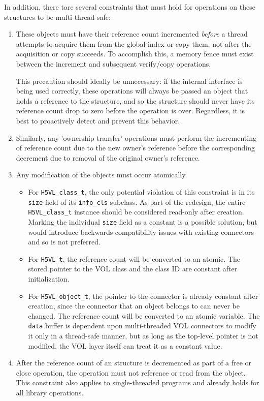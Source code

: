 \documentclass{article}
\begin{document}
In addition, there tare several constraints that must hold for operations on these structures to be multi-thread-safe:


\begin{enumerate}
    \item These objects must have their reference count incremented \textit{before} a thread attempts to acquire them from the global index or copy them, not after the acquisition or copy succeeds. To accomplish this, a memory fence must exist between the increment and subsequent verify/copy operations. 

    This precaution should ideally be unnecessary: if the internal interface is being used correctly, these operations will always be passed an object that holds a reference to the structure, and so the structure should never have its reference count drop to zero before the operation is over. Regardless, it is best to proactively detect and prevent this behavior.

    \item Similarly, any 'ownership transfer' operations must perform the incrementing of reference count due to the new owner's reference before the corresponding decrement due to removal of the original owner's reference.

    \item Any modification of the objects must occur atomically. 
    
    \begin{itemize}
        \item For \texttt{H5VL\_class\_t}, the only potential violation of this constraint is in its \texttt{size} field of its \texttt{info\_cls} subclass. As part of the redesign, the entire \texttt{H5VL\_class\_t} instance should be considered read-only after creation. Marking the individual \texttt{size} field as a constant is a possible solution, but would introduce backwards compatibility issues with existing connectors and so is not preferred. 

        \item For \texttt{H5VL\_t}, the reference count will be converted to an atomic. The stored pointer to the VOL class and the class ID are constant after initialization.

        \item For \texttt{H5VL\_object\_t}, the pointer to the connector is already constant after creation, since the connector that an object belongs to can never be changed. The reference count will be converted to an atomic variable. The \texttt{data} buffer is dependent upon multi-threaded VOL connectors to modify it only in a thread-safe manner, but as long as the top-level pointer is not modified, the VOL layer itself can treat it as a constant value.
    \end{itemize}
    
    \item After the reference count of an structure is decremented as part of a free or close operation, the operation must not reference or read from the object. This constraint also applies to single-threaded programs and already holds for all library operations.
\end{enumerate}
\end{document}
